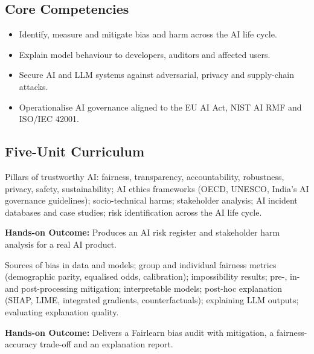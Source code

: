 \documentclass[10pt,a4paper]{article}
\begin{document}
\subsection*{Core Competencies}\begin{itemize}\small
\item Identify, measure and mitigate bias and harm across the AI life cycle.
\item Explain model behaviour to developers, auditors and affected users.
\item Secure AI and LLM systems against adversarial, privacy and supply-chain attacks.
\item Operationalise AI governance aligned to the EU AI Act, NIST AI RMF and ISO/IEC 42001.
\end{itemize}
\subsection*{Five-Unit Curriculum}
\begin{tcolorbox}[unitbox,title={{\color{gold}UNIT I}\quad Principles and Risk Foundations\hfill{\color{gold}9 Hours}}]\small Pillars of trustworthy AI: fairness, transparency, accountability, robustness, privacy, safety, sustainability; AI ethics frameworks (OECD, UNESCO, India’s AI governance guidelines); socio-technical harms; stakeholder analysis; AI incident databases and case studies; risk identification across the AI life cycle.\par\vspace{2pt}\par\textbf{Hands-on Outcome:} Produces an AI risk register and stakeholder harm analysis for a real AI product.\end{tcolorbox}
\begin{tcolorbox}[unitbox,title={{\color{gold}UNIT II}\quad Fairness and Explainability\hfill{\color{gold}9 Hours}}]\small Sources of bias in data and models; group and individual fairness metrics (demographic parity, equalised odds, calibration); impossibility results; pre-, in- and post-processing mitigation; interpretable models; post-hoc explanation (SHAP, LIME, integrated gradients, counterfactuals); explaining LLM outputs; evaluating explanation quality.\par\vspace{2pt}\par\textbf{Hands-on Outcome:} Delivers a Fairlearn bias audit with mitigation, a fairness-accuracy trade-off and an explanation report.\end{tcolorbox}
\end{document}
